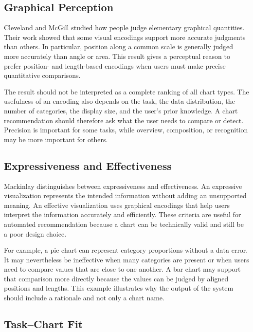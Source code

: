 \subsection{Graphical Perception}

Cleveland and McGill \cite{cleveland1984graphical} studied how people judge elementary graphical quantities. Their work showed that some visual encodings support more accurate judgments than others. In particular, position along a common scale is generally judged more accurately than angle or area. This result gives a perceptual reason to prefer position- and length-based encodings when users must make precise quantitative comparisons.

The result should not be interpreted as a complete ranking of all chart types. The usefulness of an encoding also depends on the task, the data distribution, the number of categories, the display size, and the user's prior knowledge. A chart recommendation should therefore ask what the user needs to compare or detect. Precision is important for some tasks, while overview, composition, or recognition may be more important for others.

\subsection{Expressiveness and Effectiveness}

Mackinlay \cite{mackinlay1986apt} distinguishes between expressiveness and effectiveness. An expressive visualization represents the intended information without adding an unsupported meaning. An effective visualization uses graphical encodings that help users interpret the information accurately and efficiently. These criteria are useful for automated recommendation because a chart can be technically valid and still be a poor design choice.

For example, a pie chart can represent category proportions without a data error. It may nevertheless be ineffective when many categories are present or when users need to compare values that are close to one another. A bar chart may support that comparison more directly because the values can be judged by aligned positions and lengths. This example illustrates why the output of the system should include a rationale and not only a chart name.

\subsection{Task--Chart Fit}

